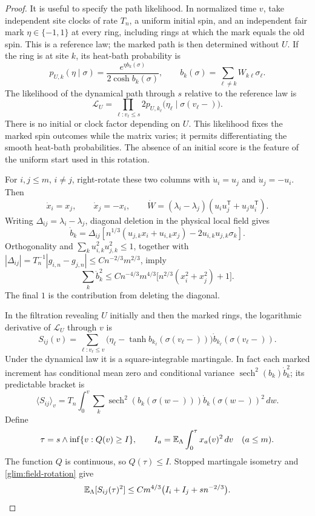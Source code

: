 \begin{proof}
It is useful to specify the path likelihood.  In normalized time
\(v\), take independent site clocks of rate \(T_n\), a uniform
initial spin, and an independent fair mark
\(\eta\in\{-1,1\}\) at every ring, including rings at which the mark
equals the old spin.  This is a reference law; the marked path is
then determined without \(U\).  If the ring is at site \(k\), its
heat-bath probability is
\[
 p_{U,k}(\eta\mid\sigma)=
 \frac{e^{\eta b_k(\sigma)}}{2\cosh b_k(\sigma)},\qquad
 b_k(\sigma)=\sum_{\ell\ne k}W_{k\ell}\sigma_\ell.
\]
The likelihood of the dynamical path through \(s\) relative to the
reference law is
\begin{equation}
 \mathcal L_U=
 \prod_{\ell:v_\ell\le s}
 2p_{U,k_\ell}\big(\eta_\ell\mid\sigma(v_\ell-)\big).
 \label{glim:path-likelihood}
\end{equation}
There is no initial or clock factor depending on \(U\).
This likelihood fixes the marked spin outcomes while the matrix
varies; it permits differentiating the smooth heat-bath probabilities.
The absence of an initial score is the feature of the uniform start
used in this rotation.

For \(i,j\le m\), \(i\ne j\), right-rotate these two columns with
\(\dot u_i=u_j\) and \(\dot u_j=-u_i\).  Then
\[
 \dot x_i=x_j,\qquad \dot x_j=-x_i,\qquad
 \dot W=(\lambda_i-\lambda_j)
          (u_i u_j^{\mathsf T}+u_j u_i^{\mathsf T}).
\]
Writing \(\Delta_{ij}=\lambda_i-\lambda_j\), diagonal deletion in
the physical local field gives
\[
 \dot b_k=\Delta_{ij}\left[
  n^{1/3}(u_{j,k}x_i+u_{i,k}x_j)
                    -2u_{i,k}u_{j,k}\sigma_k\right].
\]
Orthogonality and
\(\sum_k u_{i,k}^2u_{j,k}^2\le1\), together with
\(|\Delta_{ij}|=T_n^{-1}|g_{i,n}-g_{j,n}|
\le C n^{-2/3}m^{2/3}\), imply
\begin{equation}
 \sum_k\dot b_k^2
 \le C n^{-4/3}m^{4/3}
       \big[n^{2/3}(x_i^2+x_j^2)+1\big].
 \label{glim:field-rotation}
\end{equation}
The final \(1\) is the contribution from deleting the diagonal.

In the filtration revealing \(U\) initially and then the marked
rings, the logarithmic derivative of \(\mathcal L_U\) through \(v\) is
\[
 S_{ij}(v)=\sum_{\ell:v_\ell\le v}
  \big(\eta_\ell-\tanh b_{k_\ell}(\sigma(v_\ell-))\big)
                 \dot b_{k_\ell}(\sigma(v_\ell-)).
\]
Under the dynamical law it is a square-integrable martingale.  In
fact each marked increment has conditional mean zero and conditional
variance \(\operatorname{sech}^2(b_k)\dot b_k^2\); its predictable
bracket is
\[
 \langle S_{ij}\rangle_v
 =T_n\int_0^v\sum_k\operatorname{sech}^2(b_k(\sigma(w-)))
                         \dot b_k(\sigma(w-))^2\,dw.
\]
Define
\[
 \tau=s\wedge\inf\{v:Q(v)\ge I\},\qquad
 I_a=\mathbb E_\Lambda\int_0^\tau x_a(v)^2\,dv\quad(a\le m).
\]
The function \(Q\) is continuous, so \(Q(\tau)\le I\).  Stopped
martingale isometry and \eqref{glim:field-rotation} give
\begin{equation}
 \mathbb E_\Lambda[S_{ij}(\tau)^2]
 \le C m^{4/3}\big(I_i+I_j+s n^{-2/3}\big).
 \label{glim:rotation-score}
\end{equation}


\end{proof}
